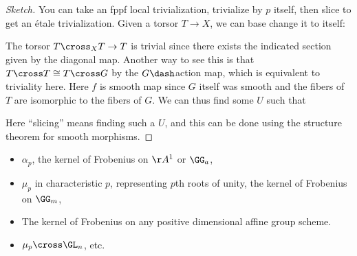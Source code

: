 \begin{proof}[Sketch]

You can take an fppf local trivialization, trivialize by \(p\) itself,
then slice to get an étale trivialization. Given a torsor \(T\to X\), we
can base change it to itself:

\begin{center}
\end{center}

The torsor \(T\cross_X T\to T\) is trivial since there exists the
indicated section given by the diagonal map. Another way to see this is
that \(T\cross T\cong T\cross G\) by the \(G\dash\)action map, which is
equivalent to triviality here. Here \(f\) is smooth map since \(G\)
itself was smooth and the fibers of \(T\) are isomorphic to the fibers
of \(G\). We can thus find some \(U\) such that

\begin{center}
\end{center}

Here ``slicing'' means finding such a \(U\), and this can be done using
the structure theorem for smooth morphisms.

\end{proof}

\begin{example}

\envlist

\begin{itemize}
\tightlist
\item
  \(\alpha_p\), the kernel of Frobenius on \(\AA^1\) or \(\GG_a\),
\item
  \(\mu_p\) in characteristic \(p\), representing \(p\)th roots of
  unity, the kernel of Frobenius on \(\GG_m\),
\item
  The kernel of Frobenius on any positive dimensional affine group
  scheme.
\item
  \(\mu_p \cross \GL_n\), etc.
\end{itemize}

\end{example}

